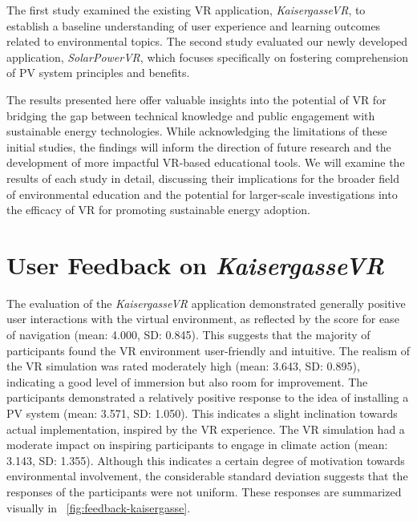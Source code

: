 \documentclass[draft, final]{vutinfth} %
\begin{document}
The first study examined the existing VR application, \textit{KaisergasseVR}, to establish a baseline understanding of user experience and learning outcomes related to environmental topics.  The second study evaluated our newly developed application, \textit{SolarPowerVR}, which focuses specifically on fostering comprehension of PV system principles and benefits.

The results presented here offer valuable insights into the potential of VR for bridging the gap between technical knowledge and public engagement with sustainable energy technologies. While acknowledging the limitations of these initial studies, the findings will inform the direction of future research and the development of more impactful VR-based educational tools. We will examine the results of each study in detail, discussing their implications for the broader field of environmental education and the potential for larger-scale investigations into the efficacy of VR for promoting sustainable energy adoption.

\section{User Feedback on \textit{KaisergasseVR}}

The evaluation of the \textit{KaisergasseVR} application demonstrated generally positive user interactions with the virtual environment, as reflected by the score for ease of navigation (mean: 4.000, SD: 0.845). This suggests that the majority of participants found the VR environment user-friendly and intuitive. The realism of the VR simulation was rated moderately high (mean: 3.643, SD: 0.895), indicating a good level of immersion but also room for improvement. The participants demonstrated a relatively positive response to the idea of installing a PV system (mean: 3.571, SD: 1.050). This indicates a slight inclination towards actual implementation, inspired by the VR experience. The VR simulation had a moderate impact on inspiring participants to engage in climate action (mean: 3.143, SD: 1.355). Although this indicates a certain degree of motivation towards environmental involvement, the considerable standard deviation suggests that the responses of the participants were not uniform. These responses are summarized visually in \figurename~\ref{fig:feedback-kaisergasse}.
\end{document}
